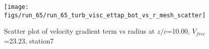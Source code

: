 \begin{figure}[H]
\centering
\texttt{[image: figs/run\_65/run\_65\_turb\_visc\_ettap\_bot\_vs\_r\_mesh\_scatter]}
\caption{Scatter plot of velocity gradient term vs radius at $z/c$=10.00, $V_{free}$=23.23, station7}
\label{fig:run_65_turb_visc_ettap_bot_vs_r_mesh_scatter}
\end{figure}


